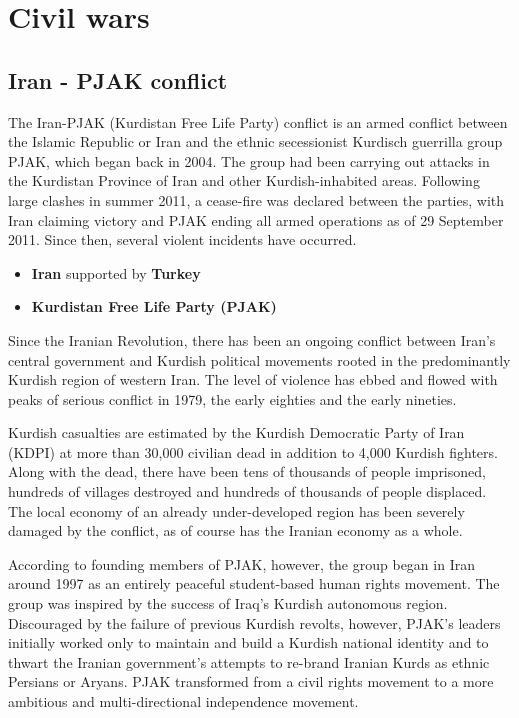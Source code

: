 \newpage
\section{Civil wars}

\subsection{Iran - PJAK conflict}
The Iran-PJAK (Kurdistan Free Life Party) conflict is an armed conflict between the Islamic Republic or Iran and the ethnic secessionist Kurdisch guerrilla group PJAK, which began back in 2004. The group had been carrying out attacks in the Kurdistan Province of Iran and other Kurdish-inhabited areas. Following large clashes in summer 2011, a cease-fire was declared between the parties, with Iran claiming victory and PJAK ending all armed operations as of 29 September 2011. Since then, several violent incidents have occurred.

\begin{itemize}
	\item \textbf{Iran}
		\subitem supported by \textbf{Turkey}
	\item \textbf{Kurdistan Free Life Party (PJAK)}
\end{itemize}

Since the Iranian Revolution, there has been an ongoing conflict between Iran’s central government and Kurdish political movements rooted in the predominantly Kurdish region of western Iran. The level of violence has ebbed and flowed with peaks of serious conflict in 1979, the early eighties and the early nineties.

Kurdish casualties are estimated by the Kurdish Democratic Party of Iran (KDPI) at more than 30,000 civilian dead in addition to 4,000 Kurdish fighters. Along with the dead, there have been tens of thousands of people imprisoned, hundreds of villages destroyed and hundreds of thousands of people displaced. The local economy of an already under-developed region has been severely damaged by the conflict, as of course has the Iranian economy as a whole.

According to founding members of PJAK, however, the group began in Iran around 1997 as an entirely peaceful student-based human rights movement. The group was inspired by the success of Iraq's Kurdish autonomous region. Discouraged by the failure of previous Kurdish revolts, however, PJAK's leaders initially worked only to maintain and build a Kurdish national identity and to thwart the Iranian government's attempts to re-brand Iranian Kurds as ethnic Persians or Aryans.
PJAK transformed from a civil rights movement to a more ambitious and multi-directional independence movement.
\newpage



